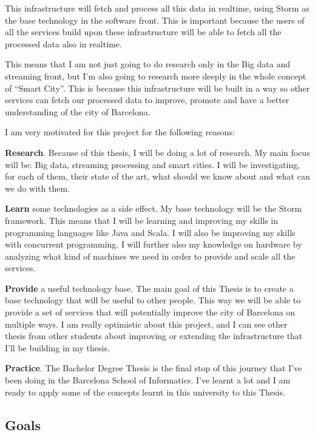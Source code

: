 This infrastructure will fetch and process all this data in realtime, using
Storm as the base technology in the software front. This is important because
the users of all the services build upon these infrastructure will be able to
fetch all the processed data also in realtime.

This means that I am not just going to do research only in the Big data and
streaming front, but I'm also going to research more deeply in the whole concept
of ``Smart City''. This is because this infrastructure will be built in a way
so other services can fetch our processed data to improve, promote and have a
better understanding of the city of Barcelona.

I am very motivated for this project for the following reasons:

\mylist
  \item {\bf Research}. Because of this thesis, I will be doing a lot of
research. My main focus will be: Big data, streaming processing and smart
cities. I will be investigating, for each of them, their state of the art, what
should we know about and what can we do with them.
  \item {\bf Learn} some technologies as a side effect. My base technology will
be the Storm framework. This means that I will be learning and improving my
skills in programming languages like Java and Scala. I will also be improving my
skills with concurrent programming. I will further also my knowledge on hardware
by analyzing what kind of machines we need in order to provide and scale all the
services.
  \item {\bf Provide} a useful technology base. The main goal of this Thesis is
to create a base technology that will be useful to other people. This way we
will be able to provide a set of services that will potentially improve the
city of Barcelona on multiple ways. I am really optimistic about this project,
and I can see other thesis from other students about improving or extending the
infrastructure that I'll be building in my thesis.
  \item {\bf Practice}. The Bachelor Degree Thesis is the final stop of this
journey that I've been doing in the Barcelona School of Informatics. I've
learnt a lot and I am ready to apply some of the concepts learnt in this
university to this Thesis.
\mylistend

\subsection{Goals}

